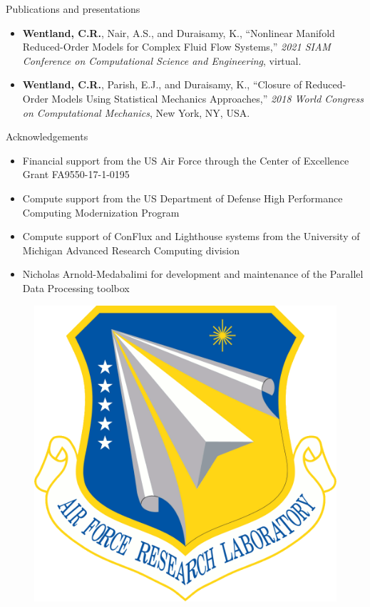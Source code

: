 \documentclass[]{beamer}
\begin{document}
\begin{frame}{Publications and presentations}
\begin{itemize}
\begin{itemize}
			\item \textbf{Wentland, C.R.}, Nair, A.S., and Duraisamy, K., ``Nonlinear Manifold Reduced-Order Models for Complex Fluid Flow Systems,'' \textit{2021 SIAM Conference on Computational Science and Engineering}, virtual.
			\item \tiny \textbf{Wentland, C.R.}, Parish, E.J., and Duraisamy, K., ``Closure of Reduced-Order Models Using Statistical Mechanics Approaches,'' \textit{2018 World Congress on Computational Mechanics}, New York, NY, USA.
		\end{itemize}
	\end{itemize}
\end{frame}

\begin{frame}{Acknowledgements}
	\begin{itemize}
	    \item Financial support from the US Air Force through the Center of Excellence Grant FA9550-17-1-0195
	    \item Compute support from the US Department of Defense High Performance Computing Modernization Program
		\item Compute support of ConFlux and Lighthouse systems from the University of Michigan Advanced Research Computing division
		\item Nicholas Arnold-Medabalimi for development and maintenance of the Parallel Data Processing toolbox
	\end{itemize}
	\begin{minipage}{0.15\linewidth}
		\vspace{0.5em}
		\begin{figure}
			\includegraphics[width=0.99\linewidth]{back_matter/afrlLogo.png}

\end{figure}
\end{minipage}
\end{frame}
\end{document}
